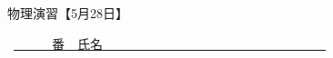 \documentclass[a4paper,9pt]{jsarticle}
\begin{document}
\hakosyokika
\begin{center}
{\Large 物理演習【5月28日】}
\end{center}
\hfill ~\underline{~~~~~~番　氏名~~~~~~~~~~~~~~~~~~~~~~~~~~~~~~~~~~~}
\hakosyokika
\begin{enumerate}
    
\vfill
    
\vfill
 \newpage
    
 \newpage
    
\newpage
    
\newpage
    
\newpage
    
\newpage
    
\newpage
    
\newpage
    
% 
\vfill
\end{enumerate}
\end{document}
